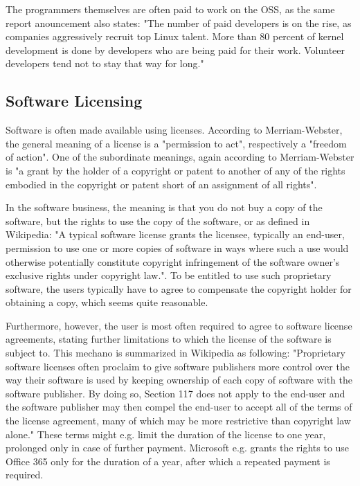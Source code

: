 \documentclass[a4paper]{report}
\begin{document}
The programmers themselves are often paid to work on the OSS, as the same report anouncement also states: "The number of paid developers is on the rise, as companies aggressively recruit top Linux talent. More than 80 percent of kernel development is done by developers who are being paid for their work. Volunteer developers tend not to stay that way for long."

\subsection{Software Licensing}
\label{ssec:SLic}
Software is often made available using licenses. According to Merriam-Webster, the general meaning of a license is a "permission to act", respectively a "freedom of action"\parencite{WebstLic}. One of the subordinate meanings, again according to Merriam-Webster is "a grant by the holder of a copyright or patent to another of any of the rights embodied in the copyright or patent short of an assignment of all rights". 

In the software business, the meaning is that you do not buy a copy of the software, but the rights to use the copy of the software, or as defined in Wikipedia: "A typical software license grants the licensee, typically an end-user, permission to use one or more copies of software in ways where such a use would otherwise potentially constitute copyright infringement of the software owner's exclusive rights under copyright law."\parencite{WikiSoftLic}. To be entitled to use such proprietary software, the users typically have to agree to compensate the copyright holder for obtaining a copy, which seems quite reasonable. 

Furthermore, however, the user is most often required to agree to software license agreements, stating further limitations to which the license of the software is subject to. This mechano is summarized in Wikipedia as following: "Proprietary software licenses often proclaim to give software publishers more control over the way their software is used by keeping ownership of each copy of software with the software publisher. By doing so, Section 117 does not apply to the end-user and the software publisher may then compel the end-user to accept all of the terms of the license agreement, many of which may be more restrictive than copyright law alone."\parencite{WikiSoftLic} These terms might e.g. limit the duration of the license to one year, prolonged only in case of further payment. Microsoft e.g. grants the rights to use Office 365 only for the duration of a year, after which a repeated payment is required\parencite{Off365}.
\end{document}
